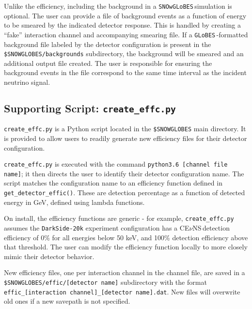 \documentclass{article}
\newcommand{\cev}{CE$\nu$NS\,}
\newcommand{\snow}{\texttt{SNOwGLoBES}\,}
\newcommand{\glb}{\texttt{GLoBES}\,}
\begin{document}
Unlike the efficiency, including the background in a \snow simulation is optional. The user can provide a file of background events as a function of energy to be smeared by the indicated detector response. This is handled by creating a ``fake'' interaction channel and accompanying smearing file. If a \glb-formatted background file labeled by the detector configuration is present in the \texttt{\$SNOWGLOBES/backgrounds} subdirectory, the background will be smeared and an additional output file created.  The user is responsible for ensuring the background events in the file correspond to the same time interval as the incident neutrino signal.

\subsection{Supporting Script: \texttt{create\_effc.py}} \label{subsec:efficsupportscript}

\texttt{create\_effc.py} is a Python script located in the \texttt{\$SNOWGLOBES} main directory.  It is provided to allow users to readily generate new efficiency files for their detector configuration.

\texttt{create\_effc.py} is executed with the command \texttt{python3.6 [channel file name]}; it then directs the user to identify their detector configuration name. The script matches the configuration name to an efficiency function defined in \texttt{get\_detector\_effic()}. These are detection percentage as a function of detected energy in GeV, defined using lambda functions. 

On install, the efficiency functions are generic - for example, \texttt{create\_effc.py} assumes the \texttt{DarkSide-20k} experiment configuration has a \cev detection efficiency of 0\% for all energies below 50 keV, and 100\% detection efficiency above that threshold. The user can modify the efficiency function locally to more closely mimic their detector behavior.

New efficiency files, one per interaction channel in the channel file, are saved in a \texttt{\$SNOWGLOBES/effic/[detector name]} subdirectory with the format \texttt{effic\_[interaction channel]\_[detector name].dat}. New files will overwrite old ones if a new savepath is not specified.

\end{document}
